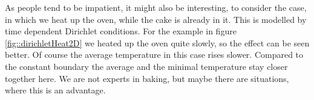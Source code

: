 
As people tend to be impatient, it might also be interesting, to consider the case, in which we heat up the oven, while the cake is already in it. This is modelled by time dependent Dirichlet conditions. For the example in figure \ref{fig::dirichletHeat2D} we heated up the oven quite slowly, so the effect can be seen better. Of course the average temperature in this case rises slower. Compared to the constant boundary the average and the minimal temperature stay closer together here. We are not experts in baking, but maybe there are situations, where this is an advantage.

\begin{figure}[htp]
	\centering
\end{figure}
